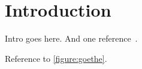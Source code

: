 \section{Introduction}

	Intro goes here.
	And one reference~\cite{practical-ore}.

	

	Reference to \cref{figure:goethe}.

